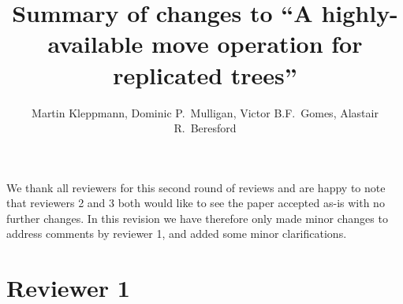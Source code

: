 \documentclass[10pt]{article}
\begin{document}
\title{Summary of changes to ``A highly-available move operation for replicated trees''}
\author{Martin Kleppmann, Dominic P.\ Mulligan, Victor B.F.\ Gomes, Alastair R.\ Beresford}
\date{}
\maketitle

We thank all reviewers for this second round of reviews and are happy to note that reviewers 2 and 3 both would like to see the paper accepted as-is with no further changes.
In this revision we have therefore only made minor changes to address comments by reviewer 1, and added some minor clarifications.

\section{Reviewer 1}
\end{document}
